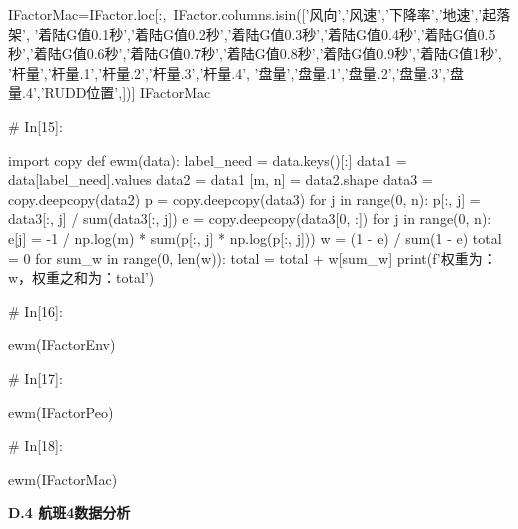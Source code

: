 \documentclass{MathorCupModeling}
\begin{document}
\begin{python}
IFactorMac=IFactor.loc[:,~IFactor.columns.isin(['风向','风速','下降率','地速','起落架',
                          '着陆G值0.1秒','着陆G值0.2秒','着陆G值0.3秒','着陆G值0.4秒','着陆G值0.5秒','着陆G值0.6秒','着陆G值0.7秒','着陆G值0.8秒','着陆G值0.9秒','着陆G值1秒',
                          '杆量','杆量.1','杆量.2','杆量.3','杆量.4',
                          '盘量','盘量.1','盘量.2','盘量.3','盘量.4','RUDD位置',])]
IFactorMac


# In[15]:


import copy
def ewm(data):
    label_need = data.keys()[:]
    data1 = data[label_need].values
    data2 = data1
    [m, n] = data2.shape
    data3 = copy.deepcopy(data2)
    p = copy.deepcopy(data3)
    for j in range(0, n):
        p[:, j] = data3[:, j] / sum(data3[:, j])
    e = copy.deepcopy(data3[0, :])
    for j in range(0, n):
        e[j] = -1 / np.log(m) * sum(p[:, j] * np.log(p[:, j]))
    w = (1 - e) / sum(1 - e)
    total = 0
    for sum_w in range(0, len(w)):
        total = total + w[sum_w]
    print(f'权重为：{w}，权重之和为：{total}')


# In[16]:


ewm(IFactorEnv)


# In[17]:


ewm(IFactorPeo)


# In[18]:


ewm(IFactorMac)


\end{python}
\newpage
\textbf{D.4 航班4数据分析}
\end{document}
